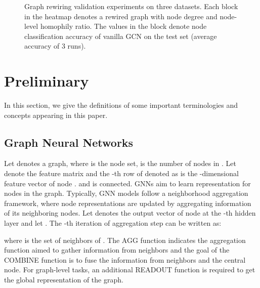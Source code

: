\documentclass[sigconf]{acmart}
\begin{document}
	
	\begin{figure*}[h]
		\begin{minipage}[t]{0.32\linewidth}
			\centering
\end{minipage}\begin{minipage}[t]{0.32\linewidth}
			\centering
		\end{minipage}
		\begin{minipage}[t]{0.32\linewidth}
			\centering
		\end{minipage}
		\caption{Graph rewiring validation experiments on three datasets. Each block in the heatmap denotes a rewired graph with  node degree and  node-level homophily ratio. The values in the block denote node classification accuracy of vanilla GCN on the test set (average accuracy of 3 runs).}
		
		\label{fig:gr_valid}
	\end{figure*} \section{Preliminary}
	In this section, we give the definitions of some important terminologies and concepts appearing in this paper.
	\subsection{Graph Neural Networks}
	Let  denotes a graph, where  is the node set,  is the number of nodes in . Let  denote the feature matrix and the -th row of  denoted as  is the -dimensional feature vector of node .  and  is connected. GNNs aim to learn representation for nodes in the graph. Typically, GNN models follow a neighborhood aggregation framework, where node representations are updated by aggregating information of its neighboring nodes. Let  denotes the output vector of node  at the -th hidden layer and let . The -th iteration of aggregation step can be written as:
	
	where   is the set of neighbors of . The AGG function indicates the aggregation function aimed to gather information from neighbors and the goal of the COMBINE function is to fuse the information from neighbors and the central node. For graph-level tasks, an additional READOUT function is required to get the global representation of the graph. 
\end{document}
